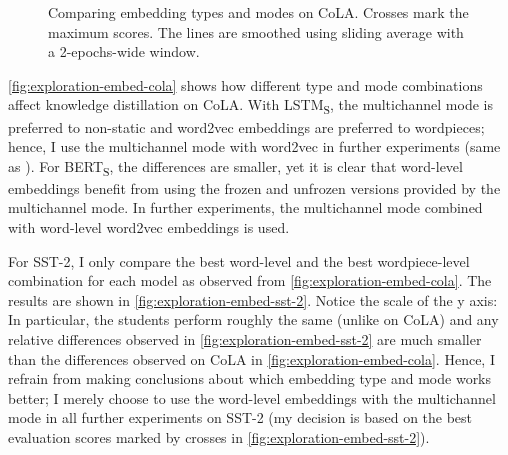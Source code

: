 \documentclass[bsc,frontabs,twoside,singlespacing,parskip,deptreport]{infthesis}
\def\BERTS{BERT\textsubscript{S}}
\def\LSTMS{LSTM\textsubscript{S}}
\def\sliding{The lines are smoothed using sliding average with a 2-epochs-wide window.}
\begin{document}
{{{      \begin{figure}[h!t]
        \centering
        \caption{Comparing embedding types and modes on CoLA. Crosses mark the maximum scores. \sliding}
        \label{fig:exploration-embed-cola}
      \end{figure}

      \autoref{fig:exploration-embed-cola} shows how different type and mode combinations affect knowledge distillation on CoLA. With \LSTMS, the multichannel mode is preferred to non-static and word2vec embeddings are preferred to wordpieces; hence, I use the multichannel mode with word2vec in further experiments (same as \citet{Tang_2019b}). For \BERTS, the differences are smaller, yet it is clear that word-level embeddings benefit from using the frozen and unfrozen versions provided by the multichannel mode. In further experiments, the multichannel mode combined with word-level word2vec embeddings is used.

      For SST-2, I only compare the best word-level and the best wordpiece-level combination for each model as observed from \autoref{fig:exploration-embed-cola}. The results are shown in \autoref{fig:exploration-embed-sst-2}. Notice the scale of the y axis: In particular, the students perform roughly the same (unlike on CoLA) and any relative differences observed in \autoref{fig:exploration-embed-sst-2} are much smaller than the differences observed on CoLA in \autoref{fig:exploration-embed-cola}. Hence, I refrain from making conclusions about which embedding type and mode works better; I merely choose to use the word-level embeddings with the multichannel mode in all further experiments on SST-2 (my decision is based on the best evaluation scores marked by crosses in \autoref{fig:exploration-embed-sst-2}).

}}}
\end{document}
